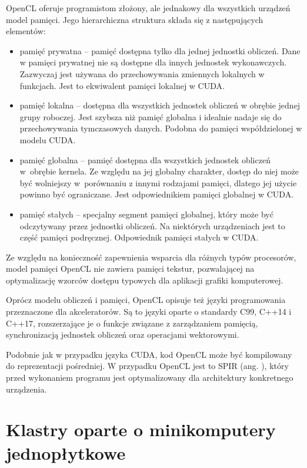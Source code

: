 OpenCL oferuje programistom złożony, ale jednakowy dla wszystkich urządzeń model pamięci. Jego hierarchiczna
struktura składa się z następujących elementów:
\begin{itemize}
      \item pamięć prywatna -- pamięć dostępna tylko dla jednej jednostki obliczeń. Dane w pamięci prywatnej nie
            są dostępne dla innych jednostek wykonawczych. Zazwyczaj jest używana do przechowywania zmiennych
            lokalnych w funkcjach. Jest to ekwiwalent pamięci lokalnej w CUDA.
      \item pamięć lokalna -- dostępna dla wszystkich jednostek obliczeń w obrębie jednej grupy roboczej. Jest szybsza
            niż pamięć globalna i idealnie nadaje się do przechowywania tymczasowych danych. Podobna do pamięci
            współdzielonej w modelu CUDA.
      \item pamięć globalna -- pamięć dostępna dla wszystkich jednostek obliczeń w~obrębie kernela. Ze względu
            na jej globalny charakter, dostęp do niej może być wolniejszy w~porównaniu z innymi rodzajami pamięci,
            dlatego jej użycie powinno być ograniczane. Jest odpowiednikiem pamięci globalnej w CUDA.
      \item pamięć stałych -- specjalny segment pamięci globalnej, który może być odczytywany przez jednostki
            obliczeń. Na niektórych urządzeniach jest to część pamięci podręcznej. Odpowiednik pamięci stałych w CUDA.
\end{itemize}

Ze względu na konieczność zapewnienia wsparcia dla różnych typów procesorów, model pamięci OpenCL nie
zawiera pamięci tekstur, pozwalającej na optymalizację wzorców dostępu typowych dla aplikacji grafiki komputerowej.

Oprócz modelu obliczeń i pamięci, OpenCL opisuje też języki programowania przeznaczone dla
akceleratorów. Są to języki oparte o standardy C99, C++14 i C++17, rozszerzające je o funkcje
związane z zarządzaniem pamięcią, synchronizacją jednostek obliczeń oraz operacjami wektorowymi.

Podobnie jak w przypadku języka CUDA, kod OpenCL może być kompilowany do reprezentacji pośredniej.
W przypadku OpenCL jest to SPIR (ang. ),
który przed wykonaniem programu jest optymalizowany dla architektury konkretnego urządzenia.
\newpage

\section{Klastry oparte o minikomputery jednopłytkowe}

